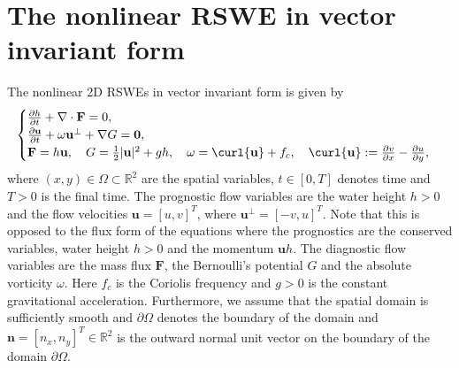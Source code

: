 \documentclass{article}
\numberwithin{equation}{section}
\theoremstyle{definition}
\begin{document}
\section{The nonlinear RSWE in vector invariant form}\label{sec:nonlinearRSWE}
The nonlinear 2D  RSWEs in vector invariant form is given by 
\begin{equation}\label{eqn:nlSWE2D}
    \begin{cases}
    \frac{\partial h}{\partial t } + \nabla \cdot \mathbf{F} = 0, \\
    \frac{\partial \mathbf{u}}{\partial t} + \omega \mathbf{u}^\perp + \nabla G = \mathbf{0},\\
    \mathbf{F}=h\mathbf{u}, \quad G = \frac{{1 }}{{2}}|\mathbf{u}|^2 +gh, \quad \omega =  \curl{\mathbf{u}} + f_c, \quad \curl{\mathbf{u}}:= \frac{\partial v}{\partial x } - \frac{\partial u}{\partial y },\end{cases}
\end{equation}
%
where $(x,y) \in \Omega \subset \mathbb{R}^2$ are the spatial variables, $t\in[0,T]$ denotes time and $T>0$ is the final time. The prognostic flow variables are the water height $h>0$ and the  flow velocities $\mathbf{u} = [u,v]^T$, where $\mathbf{u}^\perp = [-v, u]^T$. Note that this is opposed to the flux form of the equations where the prognostics are the conserved variables, water height $h>0$ and the  momentum $\mathbf{u}h$. The diagnostic flow variables are the mass flux $ \mathbf{F}$, the Bernoulli's potential $G$ and the absolute vorticity $\omega$.
Here $f_c$ is the Coriolis frequency and $g>0$ is the constant gravitational acceleration. Furthermore, we assume that the spatial domain is sufficiently smooth and $\partial \Omega$ denotes the boundary of the domain and $\mathbf{n} = [n_x, n_y]^T \in \mathbb{R}^2$ is the outward normal unit vector on the boundary of the domain $\partial \Omega$. 
\end{document}
